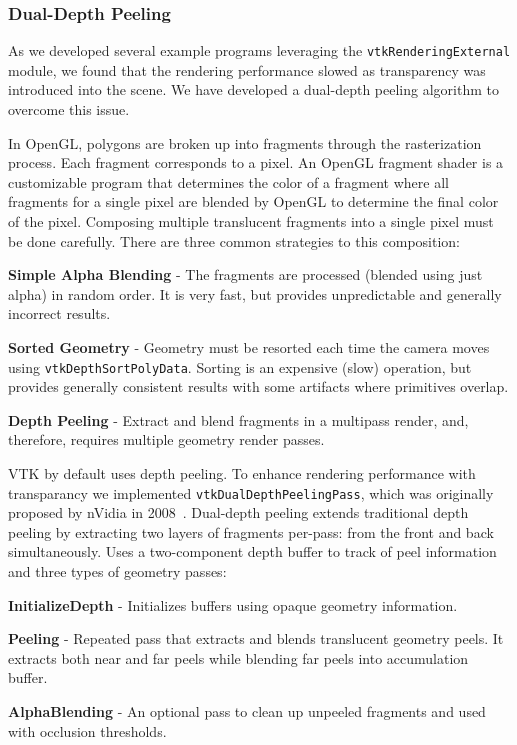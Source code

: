 \subsubsection{Dual-Depth Peeling}

As we developed several example programs leveraging the \texttt{vtkRenderingExternal} module, we found that the rendering performance slowed as transparency was introduced into the scene. We have developed a dual-depth peeling algorithm to overcome this issue.

In OpenGL, polygons are broken up into fragments through the rasterization process.
Each fragment corresponds to a pixel.
An OpenGL fragment shader is a customizable program that determines the color of a fragment where all fragments for a single pixel are blended by OpenGL to determine the final color of the pixel.
Composing multiple translucent fragments into a single pixel must be done carefully.
There are three common strategies to this composition:

\begin{compactitem}
\item \textbf{Simple Alpha Blending} - The fragments are processed (blended using just alpha) in random order.
  It is very fast, but provides unpredictable and generally incorrect results.
\item \textbf{Sorted Geometry} - Geometry must be resorted each time the camera moves using \texttt{vtkDepthSortPolyData}.
  Sorting is an expensive (slow) operation, but provides generally consistent results with some artifacts where primitives overlap.
\item \textbf{Depth Peeling} - Extract and blend fragments in a multipass render, and, therefore, requires multiple geometry render passes.
\end{compactitem}

VTK by default uses depth peeling.
To enhance rendering performance with transparancy we implemented \texttt{vtkDualDepthPeelingPass}, which was originally proposed by nVidia in 2008~\cite{Bavoil:2008}.
Dual-depth peeling extends traditional depth peeling by extracting two layers of fragments per-pass: from the front and back simultaneously.
Uses a two-component depth buffer to track of peel information and three types of geometry passes:

\begin{compactitem}
\item \textbf{InitializeDepth} - Initializes buffers using opaque geometry information.
\item \textbf{Peeling} - Repeated pass that extracts and blends translucent geometry peels.
  It extracts both near and far peels while blending far peels into accumulation buffer.
\item \textbf{AlphaBlending} - An optional pass to clean up unpeeled fragments and used with occlusion thresholds.
\end{compactitem}

